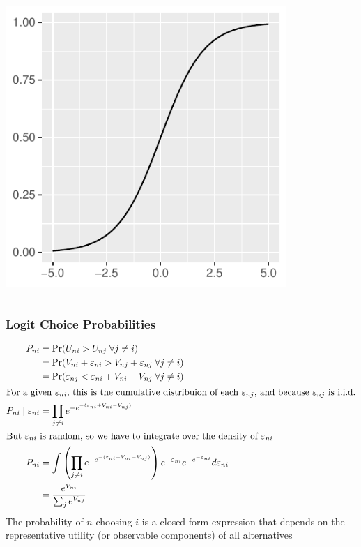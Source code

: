 \documentclass{beamer}
\begin{document}
\begin{frame}
\begin{columns}
\begin{column}{0.5\textwidth}
\begin{center}
				\includegraphics[width=0.8\textwidth]{logistic_cdf.pdf}          
     		\end{center}
		\end{column}
	\end{columns}
\end{frame}

\begin{frame}\frametitle{Logit Choice Probabilities}
	\vspace{-4ex}
    \begin{align*}
    	P_{ni} &= \Pr(U_{ni} > U_{nj} \; \forall j \neq i) \\
    	&= \Pr(V_{ni} + \varepsilon_{ni} > V_{nj} + \varepsilon_{nj} \; \forall j \neq i) \\
    	&= \Pr(\varepsilon_{nj} < \varepsilon_{ni} + V_{ni} - V_{nj} \; \forall j \neq i) \\
    	\intertext{For a given $\varepsilon_{ni}$, this is the cumulative distribuion of each $\varepsilon_{nj}$, and because $\varepsilon_{nj}$ is i.i.d.}	 
    	P_{ni} \mid \varepsilon_{ni} &= \prod_{j \neq i} e^{-e^{-(\varepsilon_{ni} + V_{ni} - V_{nj})}} \\
    	\intertext{But $\varepsilon_{ni}$ is random, so we have to integrate over the density of $\varepsilon_{ni}$}
    	P_{ni} &= \int \left( \prod_{j \neq i} e^{-e^{-(\varepsilon_{ni} + V_{ni} - V_{nj})}} \right) e^{-\varepsilon_{ni}} e^{-e^{-\varepsilon_{ni}}} d\varepsilon_{ni} \\
    	&= \frac{e^{V_{ni}}}{\sum_j e^{V_{nj}}}
    \end{align*}
    The probability of $n$ choosing $i$ is a closed-form expression that depends on the representative utility (or observable components) of all alternatives
\end{frame}
\end{document}
